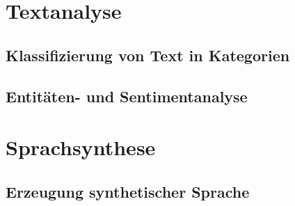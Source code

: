 \documentclass[12pt,a4paper]{article}
\begin{document}
\section{Textanalyse}
\subsection{Klassifizierung von Text in Kategorien}
\subsection{Entitäten- und Sentimentanalyse}

\newpage

\section{Sprachsynthese}
\subsection{Erzeugung synthetischer Sprache}

\newpage
	
\end{document}
